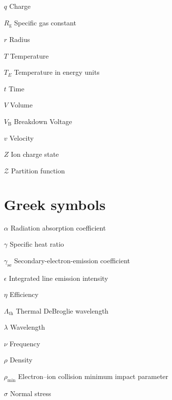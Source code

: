 \begin{multicols}{2}
\begin{nomlist}
        \item[$q$]              Charge
        \item[$R_\mathrm{g}$]   Specific gas constant
        \item[$r$]              Radius 
        \item[$T$]              Temperature
        \item[$T_E$]              Temperature in energy units
        \item[$t$]              Time
        \item[$V$]              Volume
        \item[$V_\mathrm{B}$]   Breakdown Voltage
        \item[$v$]              Velocity
        \item[$Z$]              Ion charge state
        \item[$\mathcal{Z}$]    Partition function
    \end{nomlist}

    \section*{Greek symbols}
    \begin{nomlist}
        \item[$\alpha$]         Radiation absorption coefficient %
        \item[$\gamma$]         Specific heat ratio
        \item[$\gamma_\mathrm{se}$]         Secondary-electron-emission coefficient
        \item[$\epsilon$]       Integrated line emission intensity 
        \item[$\eta$]           Efficiency 
        \item[$\Lambda_\mathrm{th}$]        Thermal DeBroglie wavelength
        \item[$\lambda$]        Wavelength
        \item[$\nu$]            Frequency
        \item[$\rho$]           Density
        \item[$\rho_\mathrm{min}$]  Electron--ion collision minimum impact parameter
        \item[$\sigma$]         Normal stress
    \end{nomlist}


\end{multicols}
